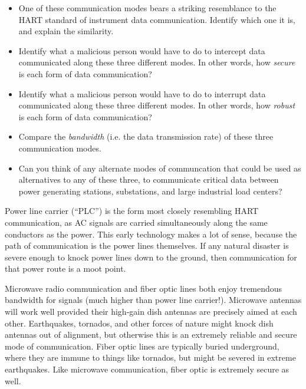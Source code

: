 \begin{itemize}
\item{} One of these communication modes bears a striking resemblance to the HART standard of instrument data communication.  Identify which one it is, and explain the similarity.
\item{} Identify what a malicious person would have to do to intercept data communicated along these three different modes.  In other words, how {\it secure} is each form of data communication?
\item{} Identify what a malicious person would have to do to interrupt data communicated along these three different modes.  In other words, how {\it robust} is each form of data communication?
\item{} Compare the {\it bandwidth} (i.e. the data transmission rate) of these three communication modes.
\item{} Can you think of any alternate modes of communcation that could be used as alternatives to any of these three, to communicate critical data between power generating stations, substations, and large industrial load centers?
\end{itemize}







Power line carrier (``PLC'') is the form most closely resembling HART communication, as AC signals are carried simultaneously along the same conductors as the power.  This early technology makes a lot of sense, because the path of communication is the power lines themselves.  If any natural disaster is severe enough to knock power lines down to the ground, then communication for that power route is a moot point.

\vskip 10pt

Microwave radio communication and fiber optic lines both enjoy tremendous bandwidth for signals (much higher than power line carrier!).  Microwave antennas will work well provided their high-gain dish antennas are precisely aimed at each other.  Earthquakes, tornados, and other forces of nature might knock dish antennas out of alignment, but otherwise this is an extremely reliable and secure mode of communication.  Fiber optic lines are typically buried underground, where they are immune to things like tornados, but might be severed in extreme earthquakes.  Like microwave communication, fiber optic is extremely secure as well.










